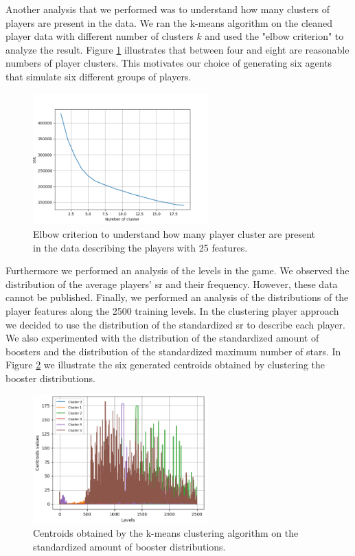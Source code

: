 Another analysis that we performed was to understand how many clusters of players are present in the data. We ran the k-means algorithm on the cleaned player data with different number of clusters $k$ and used the "elbow criterion" to analyze the result. Figure \ref{fig:k_means_players} illustrates that between four and eight are reasonable numbers of player clusters. This motivates our choice of generating six agents that simulate six different groups of players.  
\begin{figure}[!h]
  \centering
    \includegraphics[width=0.6\textwidth]{masters-thesis-master/masters-thesis/contents/04_results/pre_data_analysis/k_means_players.png}
    \caption{Elbow criterion to understand how many player cluster are present in the data describing the players with 25 features.}
    \label{fig:k_means_players}
\end{figure}
Furthermore we performed an analysis of the levels in the game. We observed the distribution of the average players' \acs{sr} and their frequency. However, these data cannot be published.  
Finally, we performed an analysis of the distributions of the player features along the 2500 training levels. In the clustering player approach we decided to use the distribution of the standardized \acs{sr} to describe each player. We also experimented with the distribution of the standardized amount of boosters and the distribution of the standardized maximum number of stars. In Figure \ref{fig:boosters_distrib} we illustrate the six generated centroids obtained by clustering the booster distributions. 
\begin{figure}[H]
  \centering
    \includegraphics[width=0.6\textwidth]{masters-thesis-master/masters-thesis/contents/04_results/pre_data_analysis/boosters_distrib.png}
    \caption{Centroids obtained by the k-means clustering algorithm on the standardized amount of booster distributions.}
    \label{fig:boosters_distrib}
\end{figure}

